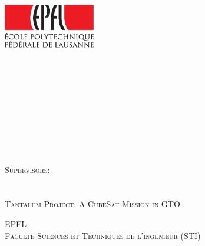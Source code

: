 \begin{titlepage}

\begin{center}


\includegraphics[width=4cm]{logo_epfl_coul.eps}

\vspace*{4cm}
\Huge
\textsc{\Ptitle}\\
\vspace{0.5cm}
\vspace{0.5cm}
\normalsize
\textsc{\Ptype }\\ %
\vspace{1cm}

\large
\textsc{\Pcand\\[0.5\baselineskip] }
\normalsize
\textsc{\Psect}\\
\vspace{0.6cm}

\large
\textsc{\Pcandtwo\\[0.5\baselineskip] }
\normalsize
\textsc{\Psecttwo}\\
\vspace{0.6cm}

\textsc{\Pseason}\\ %
\vspace{0.6cm}
\textsc{Supervisors:\\ \Pfirst\\ \Psecond}\\
\vspace{0.6cm}
\textsc{Tantalum Project: A CubeSat Mission in GTO}


\vspace{0.6cm}
\textsc{EPFL\\
Faculte Sciences et Techniques de l'ingenieur (STI)}\\

\end{center}

\end{titlepage}
